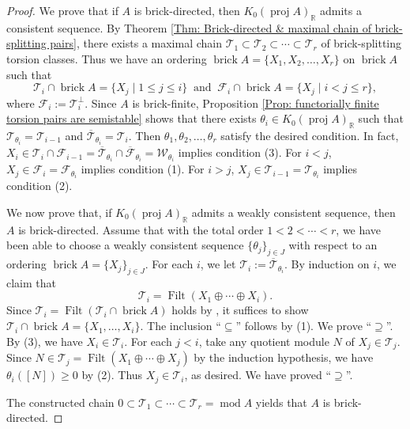 \documentclass{amsart}
\theoremstyle{thmstyle}
\theoremstyle{exstyle}
\theoremstyle{defstyle}
\theoremstyle{remstyle}
\theoremstyle{remstyle}
\DeclareMathOperator*{\modu}{mod}
\DeclareMathOperator*{\proj}{proj}
\DeclareMathOperator*{\Filt}{Filt}
\DeclareMathOperator*{\brick}{brick}
\begin{document}
 \begin{proof}
     We prove that if $A$ is brick-directed, then $K_0(\proj A)_{\mathbb{R}}$ admits a consistent sequence. By Theorem \ref{Thm: Brick-directed & maximal chain of brick-splitting pairs}, there exists a maximal chain $\mathcal{T}_1\subset \mathcal{T}_2\subset \cdots\subset \mathcal{T}_r$ of brick-splitting torsion classes. Thus we have an ordering  $\brick A=\{X_1, X_2,\ldots, X_r\}$ on $\brick A$ such that
     \[\mathcal{T}_i\cap\brick A=\{X_j\mid 1\le j\le i\}\ \mbox{ and }\ \mathcal{F}_i\cap\brick A=\{X_j\mid i<j\le r\},\] 
     where $\mathcal{F}_i:=\mathcal{T}_i^\perp$. Since $A$ is brick-finite, Proposition \ref{Prop: functorially finite torsion pairs are semistable} shows that there exists $\theta_i\in K_0(\proj A)_\mathbb{R}$ such that $\mathcal{T}_{\theta_i}=\mathcal{T}_{i-1}$ and $\overline{\mathcal{T}}_{\theta_i}=\mathcal{T}_i$. Then $\theta_1, \theta_2, \ldots,\theta_r$ satisfy the desired condition. 
     In fact, $X_i\in\mathcal{T}_i\cap\mathcal{F}_{i-1}=\overline{\mathcal{T}}_{\theta_i}\cap\overline{\mathcal{F}}_{\theta_i}=\mathcal{W}_{\theta_i}$ implies condition (3).
     For $i<j$, $X_j\in\mathcal{F}_i=\mathcal{F}_{\theta_i}$ implies condition (1). For $i>j$, $X_j\in\mathcal{T}_{i-1}=\mathcal{T}_{\theta_i}$ implies condition (2).

     We now prove that, if $K_0(\proj A)_{\mathbb{R}}$ admits a weakly consistent sequence, then $A$ is brick-directed.
    Assume that with the total order $1 < 2 < \cdots < r$, we have been able to choose a weakly consistent sequence $\{\theta_j\}_{j \in J}$ with respect to an ordering $\brick A=\{X_j\}_{j \in J}$. For each $i$, we let $\mathcal{T}_i := \overline{\mathcal{T}}_{\theta_i}$. 
     By induction on $i$, we claim that
     \[\mathcal{T}_i = \Filt(X_1 \oplus \cdots \oplus X_i).\]
     Since $\mathcal{T}_i=\Filt(\mathcal{T}_i \cap \brick A)$ holds by \cite[Lemma 3.9]{DI+}, it suffices to show $\mathcal{T}_i \cap \brick A=\{X_1,\ldots,X_i\}$. The inclusion ``$\subseteq$'' follows by (1). We prove ``$\supseteq$''.
     By (3), we have $X_i \in \mathcal{T}_i$. 
     For each $j<i$, take any quotient module $N$ of $X_j\in\mathcal{T}_j$. Since $N\in\mathcal{T}_j=\Filt(X_1\oplus\cdots\oplus X_j)$ by the induction hypothesis, we have $\theta_i([N])\ge0$ by (2). Thus $X_j\in\mathcal{T}_i$, as desired. We have proved ``$\supseteq$''.     

     The constructed chain $0 \subset \mathcal{T}_1 \subset \cdots \subset \mathcal{T}_r = \modu A$ yields that $A$ is brick-directed.
 \end{proof}
\end{document}
